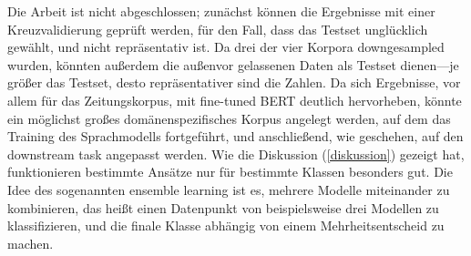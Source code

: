 Die Arbeit ist nicht abgeschlossen; zunächst können die Ergebnisse mit einer Kreuzvalidierung geprüft werden, für den Fall, dass das Testset unglücklich gewählt, und nicht repräsentativ ist. Da drei der vier Korpora downgesampled wurden, könnten außerdem die außenvor gelassenen Daten als Testset dienen---je größer das Testset, desto repräsentativer sind die Zahlen. Da sich Ergebnisse, vor allem für das Zeitungskorpus, mit fine-tuned BERT deutlich hervorheben, könnte ein möglichst großes domänenspezifisches Korpus angelegt werden, auf dem das Training des Sprachmodells fortgeführt, und anschließend, wie geschehen, auf den downstream task angepasst werden. Wie die Diskussion (\ref{diskussion}) gezeigt hat, funktionieren bestimmte Ansätze nur für bestimmte Klassen besonders gut. Die Idee des sogenannten ensemble learning ist es, mehrere Modelle miteinander zu kombinieren, das heißt einen Datenpunkt von beispielsweise drei Modellen zu klassifizieren, und die finale Klasse abhängig von einem Mehrheitsentscheid zu machen.


\nocite{*}
